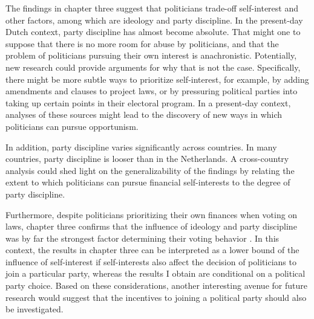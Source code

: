 The findings in chapter three suggest that politicians trade-off self-interest and other factors, among which are ideology and party discipline. In the present-day Dutch context, party discipline has almost become absolute. That might one to suppose that there is no more room for abuse by politicians, and that the problem of politicians pursuing their own interest is anachronistic. Potentially, new research could provide arguments for why that is not the case. Specifically, there might be more subtle ways to prioritize self-interest, for example, by adding amendments and clauses to project laws, or by pressuring political parties into taking up certain points in their electoral program. In a present-day context, analyses of these sources might lead to the discovery of new ways in which politicians can pursue opportunism. 

In addition, party discipline varies significantly across countries. In many countries, party discipline is looser than in the Netherlands. A cross-country analysis could shed light on the generalizability of the findings by relating the extent to which politicians can pursue financial self-interests to the degree of party discipline. 

Furthermore, despite politicians prioritizing their own finances when voting on laws, chapter three confirms that the influence of ideology and party discipline was by far the strongest factor determining their voting behavior \citep[see e.g.][]{de2003het, de2014ons}. In this context, the results in chapter three can be interpreted as a lower bound of the influence of self-interest if self-interests also affect the decision of politicians to join a particular party, whereas the results I obtain are conditional on a political party choice. Based on these considerations, another interesting avenue for future research would suggest that the incentives to joining a political party should also be investigated.

